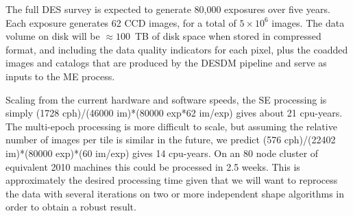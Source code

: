 \documentclass[12pt]{article}
\begin{document}
\begin{comment}
\begin{deluxetable}{lcccc}
\tabletypesize{\small}
\tablecaption{Projected Computing Purchases\label{table:computing}}
\tablewidth{0pt}
\tablehead{
	\multicolumn{1}{l}{Fiscal Year} &
	\colhead{Disk Storage}       & 
	\colhead{\$ for Storage}    & 
	\colhead{Compute Servers}   & 
	\colhead{\$ for CPU} \\
	&
	[TB] &
	&
	2010 Equivalent &
}
\startdata
2010 & 130 & 55,000 & 15 & 45,000 \\
2011 & 162 & 55,000 & 19 & 45,000 \\
2012 & 203 & 55,000 & 23 & 45,000 \\
2013 & 254 & 55,000 & 29 & 45,000 \\
2014 & 318 & 55,000 & 36 & 45,000 \\%
\enddata

\tablecomments{The number of compute nodes purchased from 2011 on is based on
the assumption that each node (26kSI2k, 104 HEP-SPEC 2006) would stay at the
performance level of a node purchased in 2010. As the performance per node will
increase over time the actual number of compute nodes after 5 years will be
significantly smaller (probably O(70)), providing a combined performance of
O(122) 2010 equivalent nodes. Prices include 40\% bulk discounts from
purchasing through the RHIC ATLAS Computing Facility at BNL.  {\bf Power,
cooling and maintence will be provided at no extra cost. }}

\end{deluxetable}

\end{comment}

The full DES survey is expected to generate 80,000 exposures over five years.
Each exposure generates 62 CCD images, for a total of $5\times 10^6$ images.
The data volume on disk will be $\approx 100$~TB of disk space when stored in
compressed format, and including the data quality indicators for each pixel,
plus the coadded images and catalogs that are produced by the DESDM pipeline
and serve as inputs to the ME process.

Scaling from the current hardware and software speeds, the SE processing is
simply (1728 cph)/(46000 im)*(80000 exp*62 im/exp) gives about 21 cpu-years.
The multi-epoch processing is more difficult to scale, but assuming the relative
number of images per tile is similar in the future, we predict (576 cph)/(22402
im)*(80000 exp)*(60 im/exp) gives 14 cpu-years.  On an 80 node cluster of
equivalent 2010 machines this could be processed in 2.5 weeks.  This is
approximately the desired processing time given that we will want to reprocess
the data with several iterations on two or more independent shape algorithms in
order to obtain a robust result.
\end{document}
